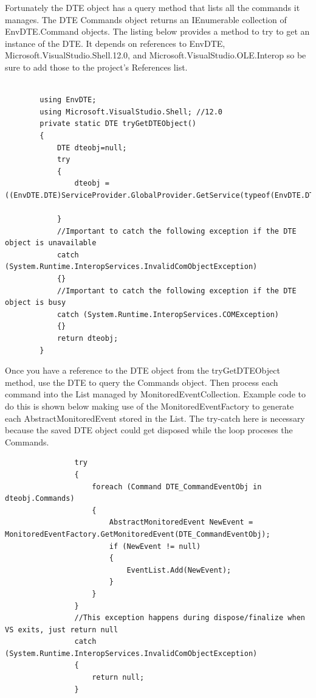 \begin{enumerate}
Fortunately the DTE object has a query method that lists all the commands it manages.   The DTE Commands object returns an IEnumerable collection of EnvDTE.Command objects. The listing below provides a method to try to get an instance of the DTE.  It depends on references to EnvDTE, Microsoft.VisualStudio.Shell.12.0, and Microsoft.VisualStudio.OLE.Interop so be sure to add those to the project's References list.

\begin{lstlisting}

		using EnvDTE;
		using Microsoft.VisualStudio.Shell; //12.0
		private static DTE tryGetDTEObject()
		{
			DTE dteobj=null;
			try
			{
				dteobj = ((EnvDTE.DTE)ServiceProvider.GlobalProvider.GetService(typeof(EnvDTE.DTE).GUID)).DTE;

			}
			//Important to catch the following exception if the DTE object is unavailable
			catch (System.Runtime.InteropServices.InvalidComObjectException)
			{} 
			//Important to catch the following exception if the DTE object is busy
			catch (System.Runtime.InteropServices.COMException)
			{}
			return dteobj;
		}

\end{lstlisting}

Once you have a reference to the DTE object from the tryGetDTEObject method, use the DTE to query the Commands  object.  Then process each command into the List managed by MonitoredEventCollection.  Example code to do this is shown below making use of the MonitoredEventFactory to generate each AbstractMonitoredEvent stored in the List.  The try-catch here is necessary because the saved DTE object could get disposed while the loop proceses the Commands.

\begin{lstlisting}
                try
                {
                    foreach (Command DTE_CommandEventObj in dteobj.Commands)
                    {
                        AbstractMonitoredEvent NewEvent = MonitoredEventFactory.GetMonitoredEvent(DTE_CommandEventObj);
                        if (NewEvent != null)
                        {
                            EventList.Add(NewEvent);
                        }
                    }
                }
                //This exception happens during dispose/finalize when VS exits, just return null
                catch (System.Runtime.InteropServices.InvalidComObjectException)
                {
                    return null;
                }
\end{lstlisting}


\end{enumerate}
